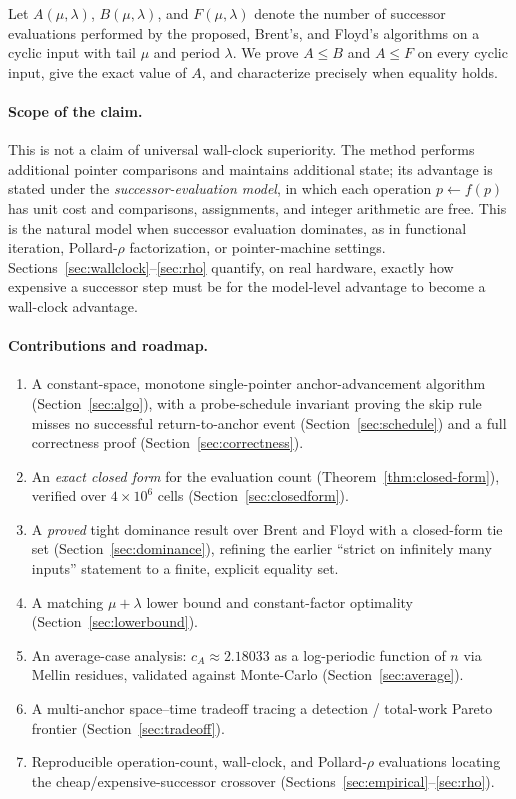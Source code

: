 \documentclass[11pt]{article}
\begin{document}
Let $A(\mu,\lambda)$, $B(\mu,\lambda)$, and $F(\mu,\lambda)$ denote the number of
successor evaluations performed by the proposed, Brent's, and Floyd's algorithms
on a cyclic input with tail $\mu$ and period $\lambda$. We prove
$A\le B$ and $A\le F$ on every cyclic input, give the exact value of $A$, and
characterize precisely when equality holds.

\paragraph{Scope of the claim.}
This is not a claim of universal wall-clock superiority. The method performs
additional pointer comparisons and maintains additional state; its advantage is
stated under the \emph{successor-evaluation model}, in which each operation
$p\leftarrow f(p)$ has unit cost and comparisons, assignments, and integer
arithmetic are free. This is the natural model when successor evaluation
dominates, as in functional iteration, Pollard-$\rho$ factorization, or
pointer-machine settings. Sections~\ref{sec:wallclock}--\ref{sec:rho} quantify,
on real hardware, exactly how expensive a successor step must be for the
model-level advantage to become a wall-clock advantage.

\paragraph{Contributions and roadmap.}
\begin{enumerate}[leftmargin=2em,itemsep=2pt]
    \item A constant-space, monotone single-pointer anchor-advancement algorithm
          (Section~\ref{sec:algo}), with a probe-schedule invariant proving the
          skip rule misses no successful return-to-anchor event
          (Section~\ref{sec:schedule}) and a full correctness proof
          (Section~\ref{sec:correctness}).
    \item An \emph{exact closed form} for the evaluation count
          (Theorem~\ref{thm:closed-form}), verified over $4{\times}10^{6}$ cells
          (Section~\ref{sec:closedform}).
    \item A \emph{proved} tight dominance result over Brent and Floyd with a
          closed-form tie set (Section~\ref{sec:dominance}), refining the earlier
          ``strict on infinitely many inputs'' statement to a finite, explicit
          equality set.
    \item A matching $\mu+\lambda$ lower bound and constant-factor optimality
          (Section~\ref{sec:lowerbound}).
    \item An average-case analysis: $c_A\approx 2.18033$ as a log-periodic
          function of $n$ via Mellin residues, validated against Monte-Carlo
          (Section~\ref{sec:average}).
    \item A multi-anchor space--time tradeoff tracing a detection / total-work
          Pareto frontier (Section~\ref{sec:tradeoff}).
    \item Reproducible operation-count, wall-clock, and Pollard-$\rho$ evaluations
          locating the cheap/expensive-successor crossover
          (Sections~\ref{sec:empirical}--\ref{sec:rho}).
\end{enumerate}
\end{document}
